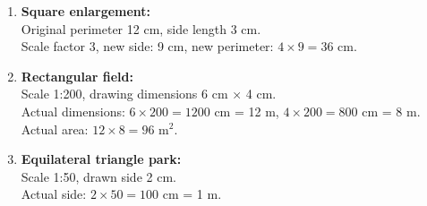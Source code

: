 \documentclass[12pt]{article}
\begin{document}
\begin{enumerate}[resume]
    \item \textbf{Square enlargement:} \\
    Original perimeter 12 cm, side length 3 cm. \\
    Scale factor 3, new side: 9 cm, new perimeter: \( 4 \times 9 = 36\) cm.

    \item \textbf{Rectangular field:} \\
    Scale 1:200, drawing dimensions 6 cm × 4 cm. \\
    Actual dimensions: \( 6 \times 200 = 1200\) cm = 12 m, \( 4 \times 200 = 800\) cm = 8 m. \\
    Actual area: \( 12 \times 8 = 96\) m\(^2\).

    \item \textbf{Equilateral triangle park:} \\
    Scale 1:50, drawn side 2 cm. \\
    Actual side: \( 2 \times 50 = 100\) cm = 1 m.
\end{enumerate}
\end{document}
